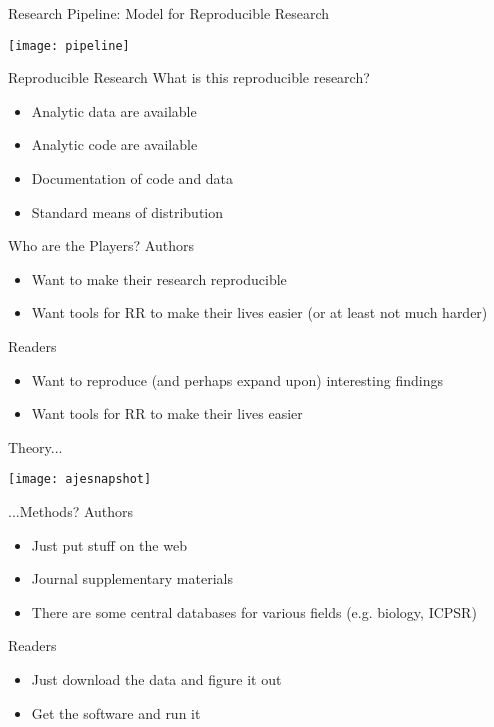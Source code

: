 \documentclass{beamer}
\begin{document}
\begin{frame}{Research Pipeline: Model for Reproducible Research}
  \begin{center}
    \texttt{[image: pipeline]}
  \end{center}
\end{frame}


\begin{frame}{Reproducible Research}
  What is this reproducible research?
  \begin{itemize}
    \item Analytic data are available
    \item Analytic code are available
    \item Documentation of code and data
    \item Standard means of distribution
  \end{itemize}
\end{frame}

\begin{frame}{Who are the Players?}
Authors
\begin{itemize}
\item Want to make their research reproducible
\item Want tools for RR to make their lives easier (or at least not
  much harder)
\end{itemize}
Readers
\begin{itemize}
\item Want to reproduce (and perhaps expand upon) interesting findings
\item Want tools for RR to make their lives easier
\end{itemize}
\end{frame}

\begin{frame}{Theory...}
\begin{center}
  \texttt{[image: ajesnapshot]}
\end{center}
\end{frame}
  
\begin{frame}{...Methods?}
Authors
\begin{itemize}
\item Just put stuff on the web
\item Journal supplementary materials
\item There are some central databases for various fields (e.g. biology, ICPSR)
\end{itemize}
Readers
\begin{itemize}
\item Just download the data and figure it out
\item Get the software and run it
\end{itemize}  
\end{frame}
  
\end{document}
